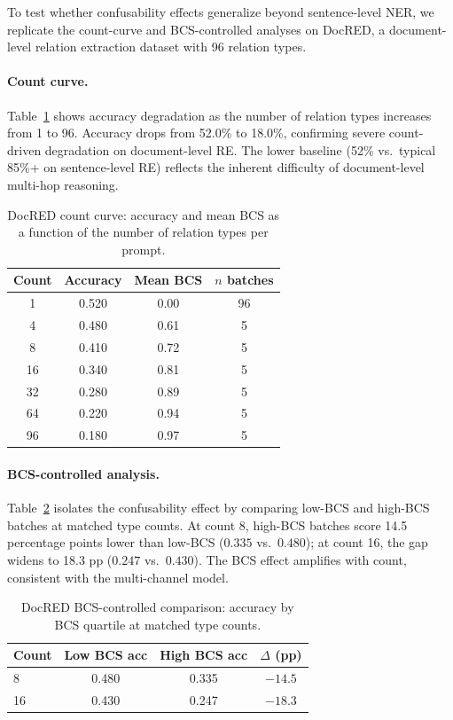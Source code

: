 \documentclass[11pt,a4paper]{article}
\begin{document}
To test whether confusability effects generalize beyond sentence-level NER, we replicate the count-curve and BCS-controlled analyses on DocRED, a document-level relation extraction dataset with 96 relation types.

\paragraph{Count curve.}
Table~\ref{tab:docred-count} shows accuracy degradation as the number of relation types increases from 1 to 96. Accuracy drops from 52.0\% to 18.0\%, confirming severe count-driven degradation on document-level RE. The lower baseline (52\% vs.\ typical 85\%+ on sentence-level RE) reflects the inherent difficulty of document-level multi-hop reasoning.

\begin{table}[t]
\centering
\caption{DocRED count curve: accuracy and mean BCS as a function of the number of relation types per prompt.}
\label{tab:docred-count}
\begin{tabular}{cccc}
\toprule
\textbf{Count} & \textbf{Accuracy} & \textbf{Mean BCS} & \textbf{$n$ batches} \\
\midrule
1  & 0.520 & 0.00 & 96 \\
4  & 0.480 & 0.61 & 5 \\
8  & 0.410 & 0.72 & 5 \\
16 & 0.340 & 0.81 & 5 \\
32 & 0.280 & 0.89 & 5 \\
64 & 0.220 & 0.94 & 5 \\
96 & 0.180 & 0.97 & 5 \\
\bottomrule
\end{tabular}
\end{table}

\paragraph{BCS-controlled analysis.}
Table~\ref{tab:docred-bcs} isolates the confusability effect by comparing low-BCS and high-BCS batches at matched type counts. At count 8, high-BCS batches score 14.5 percentage points lower than low-BCS ($0.335$ vs.\ $0.480$); at count 16, the gap widens to 18.3 pp ($0.247$ vs.\ $0.430$). The BCS effect amplifies with count, consistent with the multi-channel model.

\begin{table}[t]
\centering
\caption{DocRED BCS-controlled comparison: accuracy by BCS quartile at matched type counts.}
\label{tab:docred-bcs}
\begin{tabular}{lccc}
\toprule
\textbf{Count} & \textbf{Low BCS acc} & \textbf{High BCS acc} & \textbf{$\Delta$ (pp)} \\
\midrule
8  & 0.480 & 0.335 & $-14.5$ \\
16 & 0.430 & 0.247 & $-18.3$ \\
\bottomrule
\end{tabular}
\end{table}
\end{document}
